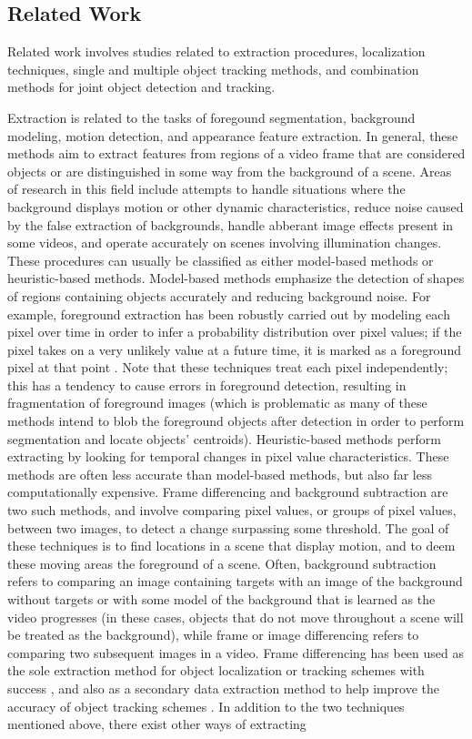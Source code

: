 \documentclass[smallcondensed, final]{svjour3}
\begin{document}
\subsection{Related Work}
\label{sec:relatedwork}


Related work involves studies related to extraction procedures, localization techniques, single and multiple object tracking methods, and combination methods for joint object detection and tracking.

Extraction is related to the tasks of foregound segmentation, background modeling, motion detection, and appearance feature extraction. In general, these methods aim to extract features from regions of a video frame that are considered objects or are distinguished in some way from the background of a scene. Areas of research in this field include attempts to handle situations where the background displays motion or other dynamic characteristics, reduce noise caused by the false extraction of backgrounds, handle abberant image effects present in some videos, and operate accurately on scenes involving illumination changes. These procedures can usually be classified as either model-based methods or heuristic-based methods. Model-based methods emphasize the detection of shapes of regions containing objects accurately and reducing background noise. For example, foreground extraction has been robustly carried out by modeling each pixel over time in order to infer a probability distribution over pixel values; if the pixel takes on a very unlikely value at a future time, it is marked as a foreground pixel at that point \citep{stauffer_1999, elgammal_2000, elgammal_2002}. Note that these techniques treat each pixel independently; this has a tendency to cause errors in foreground detection, resulting in fragmentation of foreground images (which is problematic as many of these methods intend to blob the foreground objects after detection in order to perform segmentation and locate objects' centroids). Heuristic-based methods perform extracting by looking for temporal changes in pixel value characteristics. These methods are often less accurate than model-based methods, but also far less computationally expensive. Frame differencing and background subtraction are two such methods, and involve comparing pixel values, or groups of pixel values, between two images, to detect a change surpassing some threshold. The goal of these techniques is to find locations in a scene that display motion, and to deem these moving areas the foreground of a scene.  Often, background subtraction refers to comparing an image containing targets with an image of the background without targets or with some model of the background that is learned as the video progresses (in these cases, objects that do not move throughout a scene will be treated as the background), while frame or image differencing refers to comparing two subsequent images in a video. Frame differencing has been used as the sole extraction method for object localization or tracking schemes with success \citep{pece_2002, beleznai_2006, chu_2007}, and also as a secondary data extraction method to help improve the accuracy of object tracking schemes \citep{perez_2002}. In addition to the two techniques mentioned above, there exist other ways of extracting 
\end{document}
